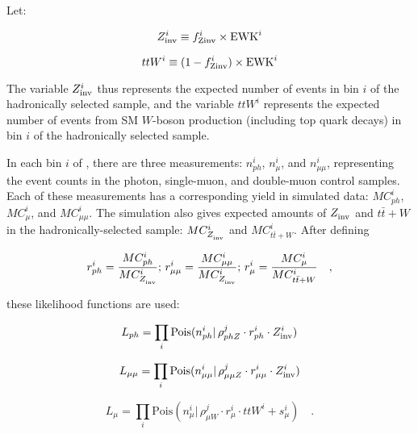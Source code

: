 Let:

\begin{equation}
  Z_{\rm inv}^{i} \equiv f_{\rm Zinv}^{i} \times \mathrm{EWK}^i 
  \label{eq:ZinvEwk}
\end{equation}

\begin{equation}
  ttW^{i} \equiv (1-f_{\rm Zinv}^{i})\times \mathrm{EWK}^i
  \label{eq:ttWEwk}
\end{equation}

The variable $Z_{\rm inv}^{i}$ thus represents the expected number of \znunu
events in \HT bin $i$ of the hadronically selected sample, and the
variable $ttW^i$ represents the expected number of events from SM
$W$-boson production (including top quark decays) in \HT bin $i$ of
the hadronically selected sample.

In each bin $i$ of \HT, there are three measurements: $n_{ph}^i$,
$n_{\mu}^i$, and $n_{\mu\mu}^i$, representing the event counts in the
photon, single-muon, and double-muon control samples.  Each of these
measurements has a corresponding yield in simulated data: $MC_{ph}^i$,
$MC_{\mu}^i$, and $MC_{\mu\mu}^i$.  The simulation also gives expected
amounts of $Z_{\rm inv}^{}$ and $t\bar{t}+W$ in the hadronically-selected
sample: $MC_{Z_{\rm inv}^{}}^i$ and $MC_{t\bar{t}+W}^i$.  After defining

\begin{equation}
r_{ph}^i = \frac{MC_{ph}^i}{MC_{Z_{\rm inv}^{}}^i};\, r_{\mu\mu}^i =
\frac{MC_{\mu\mu}^i}{MC_{Z_{\rm inv}^{}}^i};\, r_{\mu}^i =
\frac{MC_{\mu}^i}{MC_{t\bar{t}+W}^i}\quad ,
\end{equation}

these likelihood functions are used:

\begin{equation}
\label{eq:photonLikelihood}
L_{ph}= \prod_i \mathrm{Pois}(n_{ph}^i |\, \rho_{phZ}^j \cdot
r_{ph}^{i} \cdot Z_{\rm inv}^{i})
\end{equation}

\begin{equation}
\label{eq:mumuLikelihood}
L_{\mu\mu}=\prod_i \mathrm{Pois}(n_{\mu\mu}^i |\, \rho_{\mu\mu Z}^j
\cdot r_{\mu\mu}^{i} \cdot Z_{\rm inv}^{i})
\end{equation}

\begin{equation}
\label{eq:muonLikelihood}
L_{\mu}=\prod_i \mathrm{Pois}(n_{\mu}^i |\, \rho_{\mu W}^j \cdot
r_{\mu}^{i} \cdot ttW^{i} + s_{\mu}^i)\quad .
\end{equation}

